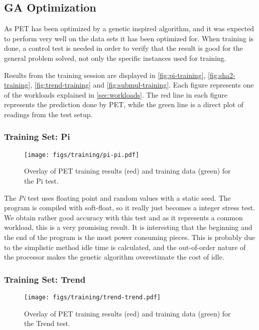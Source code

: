 \subsection{GA Optimization}

As PET has been optimized by a genetic inspired algorithm, and it was expected
to perform very well on the data sets it has been optimized for. When training
is done, a control test is needed in order to verify that the result is good for
the general problem solved, not only the specific instances used for training.

Results from the training session are displayed in \autoref{fig:pi-training},
\autoref{fig:sha2-training}, \autoref{fig:trend-training} and
\autoref{fig:submul-training}. Each figure represents one of the workloads
explained in \autoref{sec:workloads}. The red line in each figure represents the
prediction done by PET, while the green line is a direct plot of readings from
the test setup.

\newpage

\subsubsection{Training Set: Pi}
\begin{figure}[htb]
    \centering
    \texttt{[image: figs/training/pi-pi.pdf]}
    \caption{Overlay of PET training results (red) and training data (green) for the Pi test.}
    \label{fig:pi-training}
\end{figure}

The \emph{Pi} test uses floating point and random values with a static seed. The
program is compiled with soft-float, so it really just becomes a integer stress
test. We obtain rather good accuracy with this test and as it represents a
common workload, this is a very promising result. It is interesting that the
beginning and the end of the program is the most power consuming pieces. This is
probably due to the simplistic method idle time is calculated, and the
out-of-order nature of the processor makes the genetic algorithm overestimate
the cost of idle.

\newpage

\subsubsection{Training Set: Trend}
\begin{figure}[htb]
    \centering
    \texttt{[image: figs/training/trend-trend.pdf]}
    \caption{Overlay of PET training results (red) and training data (green) for the Trend test.}
    \label{fig:trend-training}
\end{figure}

